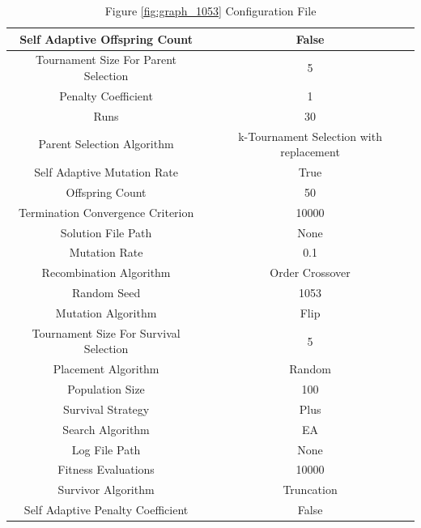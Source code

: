 \documentclass{standalone}
\begin{document}
\begin{table}[!htb]
	\centering
	\caption{Figure \ref{fig:graph_1053} Configuration File}
	\label{tab:graph_1053}
	\begin{tabular}{| c | c |}
		\hline
		Self Adaptive Offspring Count		& False		 \\
		\hline
		Tournament Size For Parent Selection		& 5		 \\
		\hline
		Penalty Coefficient		& 1		 \\
		\hline
		Runs		& 30		 \\
		\hline
		Parent Selection Algorithm		& k-Tournament Selection with replacement		 \\
		\hline
		Self Adaptive Mutation Rate		& True		 \\
		\hline
		Offspring Count		& 50		 \\
		\hline
		Termination Convergence Criterion		& 10000		 \\
		\hline
		Solution File Path		& None		 \\
		\hline
		Mutation Rate		& 0.1		 \\
		\hline
		Recombination Algorithm		& Order Crossover		 \\
		\hline
		Random Seed		& 1053		 \\
		\hline
		Mutation Algorithm		& Flip		 \\
		\hline
		Tournament Size For Survival Selection		& 5		 \\
		\hline
		Placement Algorithm		& Random		 \\
		\hline
		Population Size		& 100		 \\
		\hline
		Survival Strategy		& Plus		 \\
		\hline
		Search Algorithm		& EA		 \\
		\hline
		Log File Path		& None		 \\
		\hline
		Fitness Evaluations		& 10000		 \\
		\hline
		Survivor Algorithm		& Truncation		 \\
		\hline
		Self Adaptive Penalty Coefficient		& False		 \\
		\hline
	\end{tabular}
\end{table}
\end{document}

